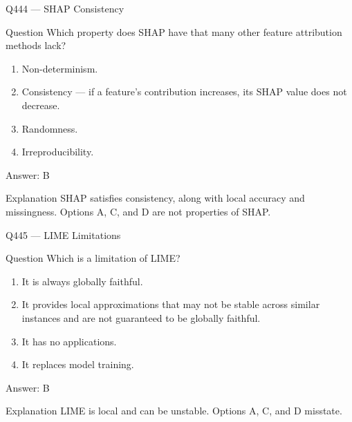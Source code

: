 \documentclass[aspectratio=169,8pt]{beamer}
\begin{document}
	\begin{frame}{Q444 --- SHAP Consistency}
		\begin{block}{Question}
			Which property does SHAP have that many other feature attribution methods lack?
			\begin{enumerate}
				\item Non-determinism.
				\item Consistency --- if a feature's contribution increases, its SHAP value does not decrease.
				\item Randomness.
				\item Irreproducibility.
			\end{enumerate}
		\end{block}
		\begin{exampleblock}{Answer: B}\end{exampleblock}
		\begin{block}{Explanation}
			SHAP satisfies consistency, along with local accuracy and missingness. Options A, C, and D are not properties of SHAP.
		\end{block}
	\end{frame}
	
	\begin{frame}{Q445 --- LIME Limitations}
		\begin{block}{Question}
			Which is a limitation of LIME?
			\begin{enumerate}
				\item It is always globally faithful.
				\item It provides local approximations that may not be stable across similar instances and are not guaranteed to be globally faithful.
				\item It has no applications.
				\item It replaces model training.
			\end{enumerate}
		\end{block}
		\begin{exampleblock}{Answer: B}\end{exampleblock}
		\begin{block}{Explanation}
			LIME is local and can be unstable. Options A, C, and D misstate.
		\end{block}
	\end{frame}
	
\end{document}
